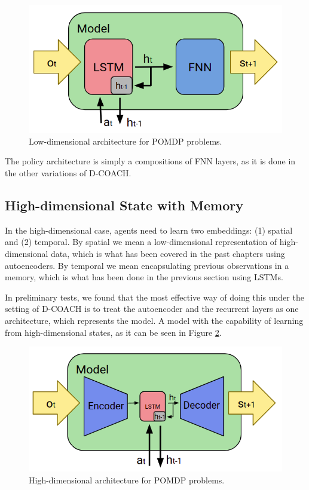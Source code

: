 \begin{figure}[h]
    \centering
    \includegraphics[width=0.7\linewidth]{imagenes/cap4/ld_model.png}
    \caption{Low-dimensional architecture for POMDP problems.}
    \label{fig:ld_model_win}
\end{figure}

The policy architecture is simply a compositions of FNN layers, as it is done in the other variations of D-COACH.

\subsection{High-dimensional State with Memory}
In the high-dimensional case, agents need to learn two embeddings: (1) spatial and (2) temporal. By spatial we mean a low-dimensional representation of high-dimensional data, which is what has been covered in the past chapters using autoencoders. By temporal we mean encapsulating previous observations in a memory, which is what has been done in the previous section using LSTMs. 

In preliminary tests, we found that the most effective way of doing this under the setting of D-COACH is to treat the autoencoder and the recurrent layers as one architecture, which represents the model. A model with the capability of learning from high-dimensional states, as it can be seen in Figure \ref{fig:rnn_hd}. 

\begin{figure}[h]
    \centering
    \includegraphics[width=0.8\linewidth]{imagenes/cap4/hd_model.png}
    \caption{High-dimensional architecture for POMDP problems.}
    \label{fig:rnn_hd}
\end{figure}

